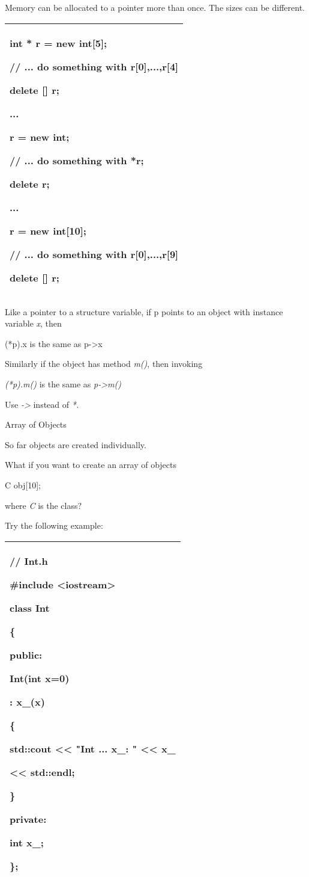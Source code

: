 \documentclass[
]{article}
\begin{document}
Memory can be allocated to a pointer more than once. The sizes can be
different.

\begin{longtable}[]{@{}l@{}}
\toprule
\endhead
\begin{minipage}[t]{0.97\columnwidth}\raggedright
int * r = new int{[}5{]};

// ... do something with r{[}0{]},...,r{[}4{]}

delete {[}{]} r;

...

r = new int;

// ... do something with *r;

delete r;

...

r = new int{[}10{]};

// ... do something with r{[}0{]},...,r{[}9{]}

delete {[}{]} r;\strut
\end{minipage}\tabularnewline
\bottomrule
\end{longtable}

Like a pointer to a structure variable, if p points to an object with
instance variable \emph{x}, then

(*p).x is the same as p-\textgreater x

Similarly if the object has method \emph{m()}, then invoking

\emph{(*p).m()} is the same as \emph{p-\textgreater m()}

Use \emph{-\textgreater{} }instead of \emph{*.}

Array of Objects

So far objects are created individually.

What if you want to create an array of objects

C obj{[}10{]};

where \emph{C} is the class?

Try the following example:

\begin{longtable}[]{@{}l@{}}
\toprule
\endhead
\begin{minipage}[t]{0.97\columnwidth}\raggedright
// Int.h

\#include \textless iostream\textgreater{}

class Int

\{

public:

Int(int x=0)

: x\_(x)

\{

std::cout \textless\textless{} "Int ... x\_: " \textless\textless{} x\_

\textless\textless{} std::endl;

\}

private:

int x\_;

\};\strut
\end{minipage}\tabularnewline
\bottomrule
\end{longtable}
\end{document}
